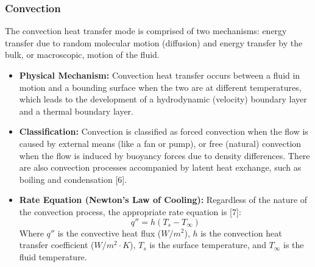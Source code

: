 \documentclass[a4paper,12pt,twoside]{report}     %
\begin{document}
\subsubsection{Convection}
The convection heat transfer mode is comprised of two mechanisms: energy transfer due to random molecular motion (diffusion) and energy transfer by the bulk, or macroscopic, motion of the fluid.
\begin{itemize}
    \item \textbf{Physical Mechanism:} Convection heat transfer occurs between a fluid in motion and a bounding surface when the two are at different temperatures, which leads to the development of a hydrodynamic (velocity) boundary layer and a thermal boundary layer. 
    \item \textbf{Classification:} Convection is classified as forced convection when the flow is caused by external means (like a fan or pump), or free (natural) convection when the flow is induced by buoyancy forces due to density differences. There are also convection processes accompanied by latent heat exchange, such as boiling and condensation [6].
    \item \textbf{Rate Equation (Newton's Law of Cooling):} Regardless of the nature of the convection process, the appropriate rate equation is [7]:
    \begin{equation}
        q'' = h (T_s - T_\infty)
    \end{equation}
    Where $q''$ is the convective heat flux ($W/m^2$), $h$ is the convection heat transfer coefficient ($W/m^2 \cdot K$), $T_s$ is the surface temperature, and $T_\infty$ is the fluid temperature.
\end{itemize}
\end{document}
